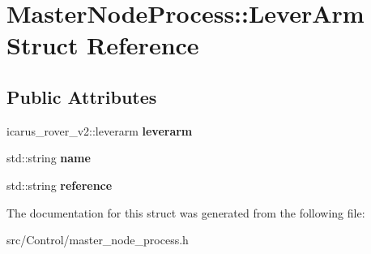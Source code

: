 \hypertarget{structMasterNodeProcess_1_1LeverArm}{}\section{Master\+Node\+Process\+:\+:Lever\+Arm Struct Reference}
\label{structMasterNodeProcess_1_1LeverArm}
\subsection*{Public Attributes}
\begin{DoxyCompactItemize}
\item 
\mbox{\label{structMasterNodeProcess_1_1LeverArm_a0bf351d6505ae16fd39e29708cf45f01}} 
icarus\+\_\+rover\+\_\+v2\+::leverarm {\bfseries leverarm}
\item 
\mbox{\label{structMasterNodeProcess_1_1LeverArm_a7603d374072685309b9eaecf7dcef6b6}} 
std\+::string {\bfseries name}
\item 
\mbox{\label{structMasterNodeProcess_1_1LeverArm_a1dd5c6d4d0ed86b2af5b190ee2b69425}} 
std\+::string {\bfseries reference}
\end{DoxyCompactItemize}


The documentation for this struct was generated from the following file\+:\begin{DoxyCompactItemize}
\item 
src/\+Control/master\+\_\+node\+\_\+process.\+h\end{DoxyCompactItemize}
